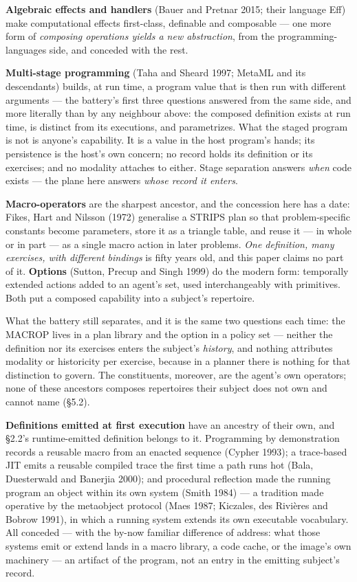 \documentclass[
]{article}
\newcounter{none} %
\begin{document}
\textbf{Algebraic effects and handlers} (Bauer and Pretnar 2015; their
language Eff) make computational effects first-class, definable and
composable --- one more form of \emph{composing operations yields a new
abstraction}, from the programming-languages side, and conceded with the
rest.

\textbf{Multi-stage programming} (Taha and Sheard 1997; MetaML and its
descendants) builds, at run time, a program value that is then run with
different arguments --- the battery's first three questions answered
from the same side, and more literally than by any neighbour above: the
composed definition exists at run time, is distinct from its executions,
and parametrizes. What the staged program is not is anyone's capability.
It is a value in the host program's hands; its persistence is the host's
own concern; no record holds its definition or its exercises; and no
modality attaches to either. Stage separation answers \emph{when} code
exists --- the plane here answers \emph{whose record it enters}.

\textbf{Macro-operators} are the sharpest ancestor, and the concession
here has a date: Fikes, Hart and Nilsson (1972) generalise a STRIPS plan
so that problem-specific constants become parameters, store it as a
triangle table, and reuse it --- in whole or in part --- as a single
macro action in later problems. \emph{One definition, many exercises,
with different bindings} is fifty years old, and this paper claims no
part of it. \textbf{Options} (Sutton, Precup and Singh 1999) do the
modern form: temporally extended actions added to an agent's set, used
interchangeably with primitives. Both put a composed capability into a
subject's repertoire.

What the battery still separates, and it is the same two questions each
time: the MACROP lives in a plan library and the option in a policy set
--- neither the definition nor its exercises enters the subject's
\emph{history}, and nothing attributes modality or historicity per
exercise, because in a planner there is nothing for that distinction to
govern. The constituents, moreover, are the agent's own operators; none
of these ancestors composes repertoires their subject does not own and
cannot name (§5.2).

\textbf{Definitions emitted at first execution} have an ancestry of
their own, and §2.2's runtime-emitted definition belongs to it.
Programming by demonstration records a reusable macro from an enacted
sequence (Cypher 1993); a trace-based JIT emits a reusable compiled
trace the first time a path runs hot (Bala, Duesterwald and Banerjia
2000); and procedural reflection made the running program an object
within its own system (Smith 1984) --- a tradition made operative by the
metaobject protocol (Maes 1987; Kiczales, des Rivières and Bobrow 1991),
in which a running system extends its own executable vocabulary. All
conceded --- with the by-now familiar difference of address: what those
systems emit or extend lands in a macro library, a code cache, or the
image's own machinery --- an artifact of the program, not an entry in
the emitting subject's record.
\end{document}
